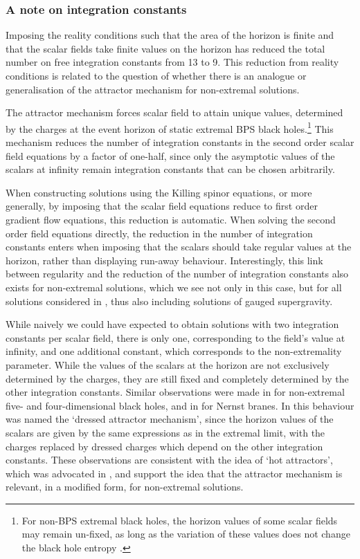 \subsubsection*{A note on integration constants}

Imposing the reality conditions such that the area of the horizon is finite and that the scalar fields take finite values on the horizon has reduced the total number on free integration constants from 13 to 9. This reduction from reality conditions is related to the question of whether there is an analogue or generalisation of the attractor mechanism for non-extremal solutions. 

The attractor mechanism \cite{Ferrara:1995ih, Ferrara:1996dd, Strominger:1996kf, Ferrara:1996um} forces scalar field to attain unique values, determined by the charges at the event horizon of static extremal BPS black holes.\footnote{For non-BPS extremal black holes, the horizon values of some scalar fields may remain un-fixed, as long as the variation of these values does not change the black hole entropy \cite{Sen:2005wa}.} This mechanism reduces the number of integration constants in the second order scalar field equations by a factor of one-half, since only the asymptotic values of the scalars at infinity remain integration constants that can be chosen arbitrarily. 

When constructing solutions using the Killing spinor equations, or more generally, by imposing that the scalar field equations reduce to first order gradient flow equations, this reduction is automatic. When solving the second order field equations directly, the reduction in the number of integration constants enters when imposing that the scalars should take regular values at the horizon, rather than displaying run-away behaviour. Interestingly, this link between regularity and the reduction of the number of integration constants also exists for non-extremal solutions, which we see not only in this case, but for all solutions considered in \cite{Gutowski:2019iyo}, thus also including solutions of gauged supergravity. 

While naively we could have expected to obtain solutions with two integration constants per scalar field, there is only one, corresponding to the field's value at infinity, and one additional constant, which corresponds to the non-extremality parameter. While the values of the scalars at the horizon are not exclusively determined by the charges, they are still fixed and completely determined by the other integration constants.  Similar observations were made in \cite{Errington:2014bta, Mohaupt:2010fk} for non-extremal five- and four-dimensional black holes, and in \cite{Dempster:2015} for Nernst branes. In \cite{Mohaupt:2010fk} this behaviour was named the `dressed attractor mechanism', since the horizon values of the scalars are given by the same expressions as in the extremal limit, with the charges replaced by dressed charges which depend on the other integration constants. These observations are consistent with the idea of `hot attractors', which was advocated in \cite{Goldstein:2014gta, Goldstein:2014qha, Goldstein:2018mwt}, and support the idea that the attractor mechanism is relevant, in a modified form, for non-extremal solutions. 


